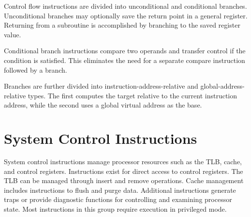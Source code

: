Control flow instructions are divided into unconditional and conditional branches. Unconditional branches may optionally save the return point in a general register. Returning from a subroutine is accomplished by branching to the saved register value.

Conditional branch instructions compare two operands and transfer control if the condition is satisfied. This eliminates the need for a separate compare instruction followed by a branch.

Branches are further divided into instruction-address-relative and global-address-relative types. The first computes the target relative to the current instruction address, while the second uses a global virtual address as the base.

\section*{System Control Instructions}

System control instructions manage processor resources such as the TLB, cache, and control registers. Instructions exist for direct access to control registers. The TLB can be managed through insert and remove operations. Cache management includes instructions to flush and purge data. Additional instructions generate traps or provide diagnostic functions for controlling and examining processor state. Most instructions in this group require execution in privileged mode.